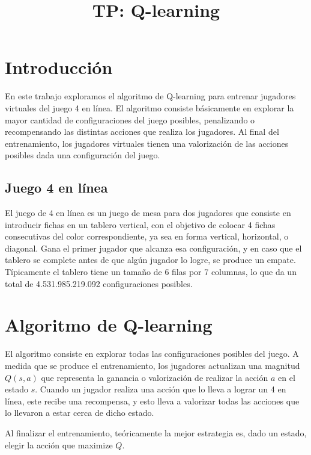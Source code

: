 \documentclass[11pt, spanish]{article}
\title{TP: Q-learning}
\begin{document}
\maketitle

\section{Introducción}
\par En este trabajo exploramos el algoritmo de Q-learning para entrenar jugadores virtuales del juego 4 en línea. El algoritmo consiste básicamente en explorar la mayor cantidad de configuraciones del juego posibles, penalizando o recompensando las distintas acciones que realiza los jugadores. Al final del entrenamiento, los jugadores virtuales tienen una valorización de las acciones posibles dada una configuración del juego. 

\subsection{Juego 4 en línea}

\par El juego de 4 en línea es un juego de mesa para dos jugadores que consiste en introducir fichas en un tablero vertical, con el objetivo de colocar 4 fichas consecutivas del color correspondiente, ya sea en forma vertical, horizontal, o diagonal. Gana el primer jugador que alcanza esa configuración, y en caso que el tablero se complete antes de que algún jugador lo logre, se produce un empate. Típicamente el tablero tiene un tamaño de 6 filas por 7 columnas, lo que da un total de 4.531.985.219.092 configuraciones posibles.

\section{Algoritmo de Q-learning}

\par El algoritmo consiste en explorar todas las configuraciones posibles del juego. A medida que se produce el entrenamiento, los jugadores actualizan una magnitud $Q(s,a)$ que representa la ganancia o valorización de realizar la acción $a$ en el estado $s$. Cuando un jugador realiza una acción que lo lleva a lograr un 4 en línea, este recibe una recompensa, y esto lleva a valorizar todas las acciones que lo llevaron a estar cerca de dicho estado. 
\par Al finalizar el entrenamiento, teóricamente la mejor estrategia es, dado un estado, elegir la acción que maximize $Q$.
\end{document}
